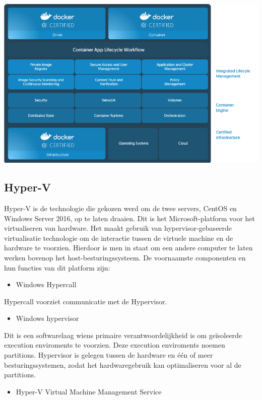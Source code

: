 \begin{center}
	\includegraphics[scale=0.2]{img/dockerce.png}
\end{center}

\subsection{Hyper-V}
Hyper-V is de technologie die gekozen werd om de twee servers, CentOS en Windows Server 2016, op te laten draaien. Dit is het Microsoft-platform voor het virtualiseren van hardware. Het maakt gebruik van hypervisor-gebaseerde virtualisatie technologie om de interactie tussen de virtuele machine en de hardware te voorzien. Hierdoor is men in staat om een andere computer te laten werken bovenop het host-besturingssysteem. De voornaamste componenten en hun functies van dit platform zijn:

\begin{itemize}[noitemsep]
	\item Windows Hypercall
\end{itemize}

Hypercall voorziet communicatie met de Hypervisor.

\begin{itemize}[noitemsep]
	\item Windows hypervisor
\end{itemize}

Dit is een softwarelaag wiens primaire verantwoordelijkheid is om geïsoleerde execution enviroments te voorzien. Deze execution enviroments noemen partitions. Hypervisor is gelegen tussen de hardware en één of meer besturingssystemen, zodat het hardwaregebruik kan optimaliseren voor al de partitions.

\begin{itemize}[noitemsep]
	\item Hyper-V Virtual Machine Management Service
\end{itemize}

